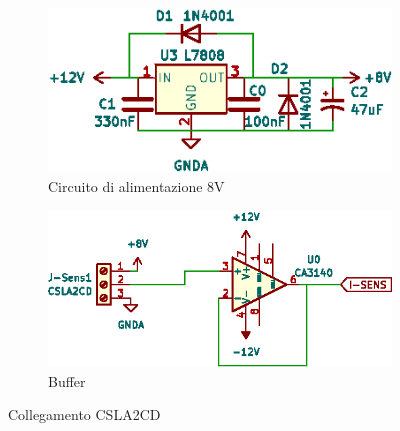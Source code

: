\begin{figure}[H]
    \centering
    \begin{subfigure}{0.49\textwidth}
        \centering
        \includegraphics[scale=1.3]{corrente/lm7080.eps}
        \caption{Circuito di alimentazione 8V}
        \label{fig:8v}
    \end{subfigure}
    \begin{subfigure}{0.49\textwidth}
        \centering
        \includegraphics[scale=1.3]{corrente/buffer_csla2cd.eps}
        \caption{Buffer}
    \end{subfigure}
    \caption{Collegamento CSLA2CD}
\end{figure}